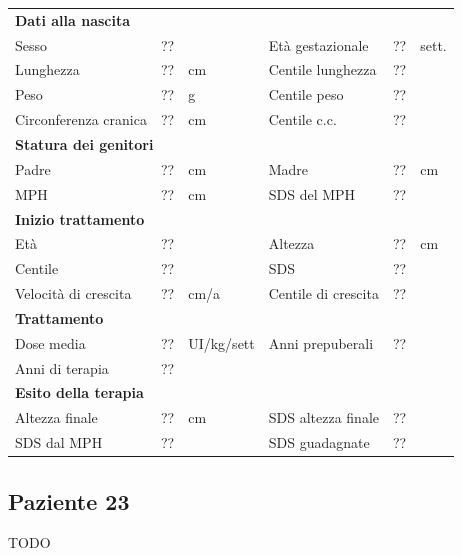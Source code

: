 \begin{table}[!h]
\begin{tabular}{lrllrl}
\toprule
\multicolumn{6}{l}{\textbf{Dati alla nascita}}\\
Sesso 		& \multicolumn{2}{l}{??} 	& Età gestazionale 		& ?? 		& sett.\\
Lunghezza 	& ?? 		& cm 				& Centile lunghezza		& ?? 		\\
Peso 		& ?? 		& g					& Centile peso			& ?? 		\\
Circonferenza cranica	& ?? 		& cm 	& Centile c.c.			& ?? \\
\midrule
\multicolumn{6}{l}{\textbf{Statura dei genitori}}\\
Padre 		& ?? & cm 	& Madre 				& ?? & cm \\
MPH 		& ?? & cm 	& SDS del MPH 			& ??\\
\midrule
\multicolumn{6}{l}{\textbf{Inizio trattamento}} \\
Età	& ?? & 		& Altezza 				& ?? & cm  \\
Centile & ?? 	 &		& SDS		& ?? \\
Velocità di crescita & ?? & cm/a	& Centile di crescita & ??\\
\midrule
\multicolumn{6}{l}{\textbf{Trattamento}} \\
Dose media		& ?? & UI/kg/sett & Anni prepuberali & ??\\
Anni di terapia & ??\\
\midrule
\multicolumn{6}{l}{\textbf{Esito della terapia}} \\
Altezza finale			& ?? & cm 	& SDS altezza finale		& ??\\
SDS dal MPH				& ?? &		& SDS guadagnate 			& ??\\
\bottomrule
\end{tabular}
\end{table}
\clearpage


\subsection*{Paziente 23}

TODO

